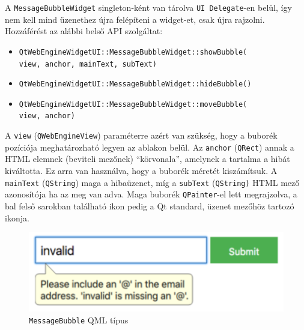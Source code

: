 \documentclass[12pt]{report}
\begin{document}
A \texttt{MessageBubbleWidget} singleton-ként van tárolva \texttt{UI Delegate}-en belül,
így nem kell mind üzenethez újra felépíteni a widget-et, csak újra rajzolni. Hozzáférést
az alábbi belső API szolgáltat:
\begin{itemize}
    \item \texttt{QtWebEngineWidgetUI::MessageBubbleWidget::showBubble(} \\
                    \texttt{view, anchor, mainText, subText)}
    \item \texttt{QtWebEngineWidgetUI::MessageBubbleWidget::hideBubble()}
    \item \texttt{QtWebEngineWidgetUI::MessageBubbleWidget::moveBubble(} \\
                    \texttt{view, anchor)}
\end{itemize}
A \texttt{view} (\texttt{QWebEngineView}) paraméterre azért van szükség, hogy a buborék
pozíciója meghatározható legyen az ablakon belül. Az \texttt{anchor} (\texttt{QRect}) annak
a HTML elemnek (beviteli mezőnek) ``körvonala'', amelynek a tartalma a hibát kiváltotta.
Ez arra van használva, hogy a buborék méretét kiszámítsuk. A \texttt{mainText}
(\texttt{QString}) maga a hibaüzenet, míg a \texttt{subText} (\texttt{QString)} HTML mező
azonosítója ha az meg van adva. Maga buborék \texttt{QPainter}-el lett megrajzolva, a bal
felső sarokban található ikon pedig a Qt standard, üzenet mezőhöz tartozó ikonja.

\begin{figure}[ht]
    \centering
    \includegraphics[scale=0.75]{bubi-quick-screenshot}
    \caption{
        \label{fig:bubi-quick-screenshot}
        \texttt{MessageBubble} QML típus
    }
\end{figure}
\end{document}
